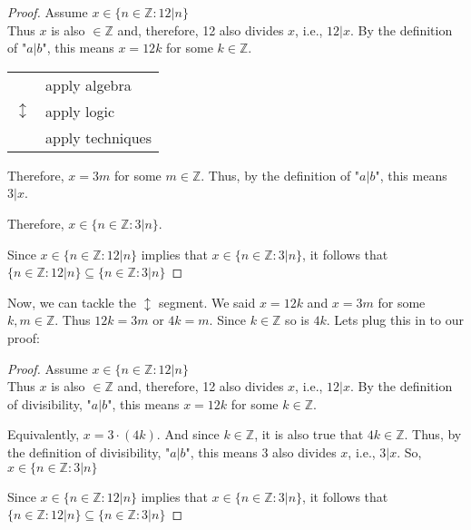 \documentclass{amsart} %
\theoremstyle{definition} %
\theoremstyle{proposition} %
\theoremstyle{remark} %
\begin{document}
\begin{proof}
      Assume $x \in \{n \in \mathbb{Z}: 12|n \}$ \\
      Thus $x$ is also $\in \mathbb{Z}$ and, therefore, 12 also divides $x$, i.e., $12|x$. By the definition of "$a | b$", this means $x=12k$ for some $k \in \mathbb{Z}$.

      \begin{center}
      \begin{tabular}{r l}
            \multirow{3}{*}{\huge $\updownarrow$} & apply algebra \\ %
            & apply logic \\
            & apply techniques \\
      \end{tabular}
      \end{center}

      Therefore, $x = 3m$ for some $m \in \mathbb{Z}$. Thus, by the definition of "$a | b$", this means $3 | x$.

      Therefore, $x \in \{n \in \mathbb{Z} : 3|n \}$.

      Since $x \in\{n \in \mathbb{Z}: 12|n \}$ implies that $x \in \{n \in \mathbb{Z} : 3|n \}$, it follows that \\ $\{n \in \mathbb{Z}: 12|n \} \subseteq \{n \in \mathbb{Z} : 3|n \}$

\end{proof}

Now, we can tackle the $\updownarrow$ segment. We said $x = 12k$ and $x = 3m$ for some $k, m \in \mathbb{Z}$. Thus $12k = 3m$ or $4k = m$. Since $k \in \mathbb{Z}$ so is $4k$. Lets plug this in to our proof:

\begin{proof}
      Assume $x \in \{n \in \mathbb{Z}: 12|n \}$ \\
      Thus $x$ is also $\in \mathbb{Z}$ and, therefore, 12 also divides $x$, i.e., $12|x$. By the definition of divisibility, "$a | b$", this means $x=12k$ for some $k \in \mathbb{Z}$.

      Equivalently, $x = 3\cdot(4k)$.
      And since $k \in \mathbb{Z}$, it is also true that $4k \in \mathbb{Z}$. Thus, by the definition of divisibility, "$a | b$", this means 3 also divides $x$, i.e., $3 | x$. So, $x \in \{n \in \mathbb{Z} : 3|n \}$

      Since $x \in\{n \in \mathbb{Z}: 12|n \}$ implies that $x \in \{n \in \mathbb{Z} : 3|n \}$, it follows that \\ $\{n \in \mathbb{Z}: 12|n \} \subseteq \{n \in \mathbb{Z} : 3|n \}$

\end{proof}
\end{document}
